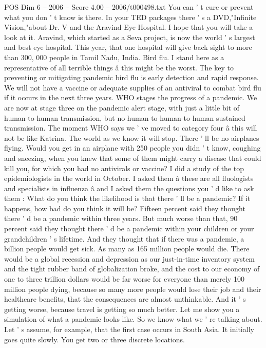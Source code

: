 \begin{textsample}{POS Dim 6 – 2006 – Score 4.00 – 2006/t000498.txt}
You can ' t cure or prevent what you don ' t know is there.
In your TED packages there ' s a DVD,"Infinite Vision,"about Dr.
V and the Aravind Eye Hospital.
I hope that you will take a look at it.
Aravind, which started as a Seva project, is now the world ' s largest and best eye hospital.
This year, that one hospital will give back sight to more than 300, 000 people in Tamil Nadu, India.
Bird flu.
I stand here as a representative of all terrible things â this might be the worst.
The key to preventing or mitigating pandemic bird flu is early detection and rapid response.
We will not have a vaccine or adequate supplies of an antiviral to combat bird flu if it occurs in the next three years.
WHO stages the progress of a pandemic.
We are now at stage three on the pandemic alert stage, with just a little bit of human-to-human transmission, but no human-to-human-to-human sustained transmission.
The moment WHO says we ' ve moved to category four â this will not be like Katrina.
The world as we know it will stop.
There ' ll be no airplanes flying.
Would you get in an airplane with 250 people you didn ' t know, coughing and sneezing, when you knew that some of them might carry a disease that could kill you, for which you had no antivirals or vaccine?
I did a study of the top epidemiologists in the world in October.
I asked them â these are all fluologists and specialists in influenza â and I asked them the questions you ' d like to ask them : What do you think the likelihood is that there ' ll be a pandemic?
If it happens, how bad do you think it will be?
Fifteen percent said they thought there ' d be a pandemic within three years.
But much worse than that, 90 percent said they thought there ' d be a pandemic within your children or your grandchildren ' s lifetime.
And they thought that if there was a pandemic, a billion people would get sick.
As many as 165 million people would die.
There would be a global recession and depression as our just-in-time inventory system and the tight rubber band of globalization broke, and the cost to our economy of one to three trillion dollars would be far worse for everyone than merely 100 million people dying, because so many more people would lose their job and their healthcare benefits, that the consequences are almost unthinkable.
And it ' s getting worse, because travel is getting so much better.
Let me show you a simulation of what a pandemic looks like.
So we know what we ' re talking about.
Let ' s assume, for example, that the first case occurs in South Asia.
It initially goes quite slowly.
You get two or three discrete locations.

\end{textsample}
